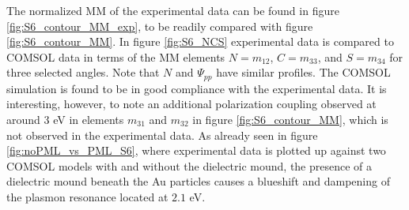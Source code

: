 The normalized MM of the experimental data can be found in figure \ref{fig:S6_contour_MM_exp}, to be readily compared with figure \ref{fig:S6_contour_MM}. In figure \ref{fig:S6_NCS} experimental data is compared to COMSOL data in terms of the MM elements $N=m_{12}$, $C=m_{33}$, and $S=m_{34}$ for three selected angles. Note that $N$ and $\Psi_{pp}$ have similar profiles. The COMSOL simulation is found to be in good compliance with the experimental data. It is interesting, however, to note an additional polarization coupling observed at around $3$ eV in elements $m_{31}$ and $m_{32}$ in figure \ref{fig:S6_contour_MM}, which is not observed in the experimental data. As already seen in figure \ref{fig:noPML_vs_PML_S6}, where experimental data is plotted up against two COMSOL models with and without the dielectric mound, the presence of a dielectric mound beneath the Au particles causes a blueshift and dampening of the plasmon resonance located at $2.1$ eV. 

